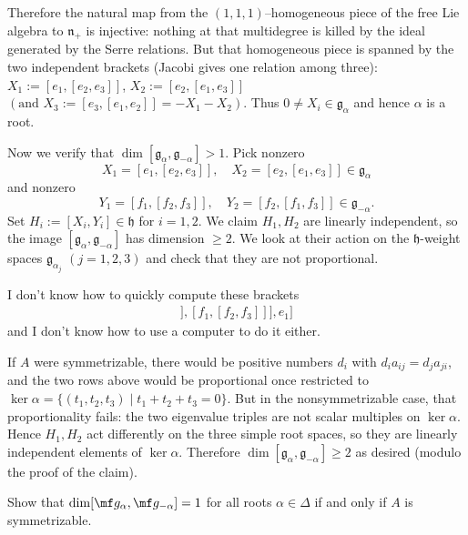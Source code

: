 \documentclass[12pt]{article}
\begin{document}
\begin{solution}[Incomplete]
    Therefore the natural map from the $(1,1,1)$–homogeneous piece of the free Lie algebra to $\mathfrak{n}_+$ is injective: nothing at that multidegree is killed by the ideal generated by the Serre relations. But that homogeneous piece is spanned by the two independent brackets (Jacobi gives one relation among three):
    $X_1:=[e_1,[e_2,e_3]]$, $X_2:=[e_2,[e_1,e_3]]$ $(\text{and }X_3:=[e_3,[e_1,e_2]]=-X_1-X_2)$. Thus $0\neq X_i\in \mathfrak{g}_{\alpha}$ and hence $\alpha$ is a root.


    Now we verify that $\dim [\mathfrak{g}_\alpha,\mathfrak{g}_{-\alpha}]>1$. Pick nonzero
    \[
        X_1=[e_1,[e_2,e_3]], \quad X_2=[e_2,[e_1,e_3]]\in \mathfrak{g}_\alpha
    \]
    and nonzero
    \[
        Y_1=[f_1,[f_2,f_3]], \quad Y_2=[f_2,[f_1,f_3]]\in \mathfrak{g}_{-\alpha}.
    \]
    Set
    $H_i:=[X_i,Y_i]\in\mathfrak{h}$ for $i=1,2$. We claim $H_1,H_2$ are linearly independent, so the image $[\mathfrak{g}_\alpha,\mathfrak{g}_{-\alpha}]$ has dimension $\geq2$. We look at their action on the $\mathfrak{h}$-weight spaces $\mathfrak{g}_{\alpha_j}$ $(j=1,2,3)$ and check that they are not proportional.

    I don't know how to quickly compute these brackets \begin{align*}
        [[[e_1,[e_2,e_3]],[f_1,[f_2,f_3]]],e_1]
    \end{align*} and I don't know how to use a computer to do it either. 

    If $A$ were symmetrizable, there would be positive numbers $d_i$ with $d_i a_{ij}=d_j a_{ji}$, and the two rows above would be proportional once restricted to $\ker\alpha=\{(t_1,t_2,t_3)\mid t_1+t_2+t_3=0\}$. But in the nonsymmetrizable case, that proportionality fails: the two eigenvalue triples are not scalar multiples on $\ker\alpha$. Hence $H_1,H_2$ act differently on the three simple root spaces, so they are linearly independent elements of $\ker\alpha$. Therefore $\dim [\mathfrak{g}_\alpha,\mathfrak{g}_{-\alpha}] \geq 2$ as desired (modulo the proof of the claim).
\end{solution}

\begin{exercise}
    Show that $\dim [\mf g_\alpha,\mf g_{-\alpha}] = 1$ for all roots $\alpha \in \Delta$ if and only if $A$ is symmetrizable.
\end{exercise}
\end{document}
